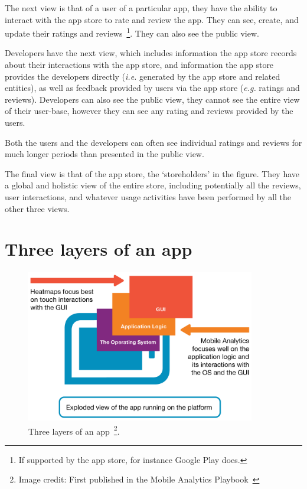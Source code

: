 The next view is that of a user of a particular app, they have the ability to interact with the app store to rate and review the app. They can see, create, and update their ratings and reviews~\footnote{If supported by the app store, for instance Google Play does.}. They can also see the public view.

Developers have the next view, which includes information the app store records about their interactions with the app store, and information the app store provides the developers directly (\emph{i.e.} generated by the app store and related entities), as well as feedback provided by users via the app store (\emph{e.g.} ratings and reviews). Developers can also see the public view, they cannot see the entire view of their user-base, however they can see any rating and reviews provided by the users.

Both the users and the developers can often see individual ratings and reviews for much longer periods than presented in the public view. 

The final view is that of the app store, the `storeholders' in the figure. They have a global and holistic view of the entire store, including potentially all the reviews, user interactions, and whatever usage activities have been performed by all the other three views.


\section{Three layers of an app}
\begin{figure}[ht]
    \begin{minipage}{\textwidth}
    \centering
    \includegraphics[width=10cm]{images/mobile-analytics-playbook/3-layers.png}
    \caption[Three layers of an app]{Three layers of an app~\footnote{Image credit: First published in the Mobile Analytics Playbook~\cite{harty_aymer_playbook_2016}}.}
    \label{fig:3-layers}
    \end{minipage}
\end{figure}

